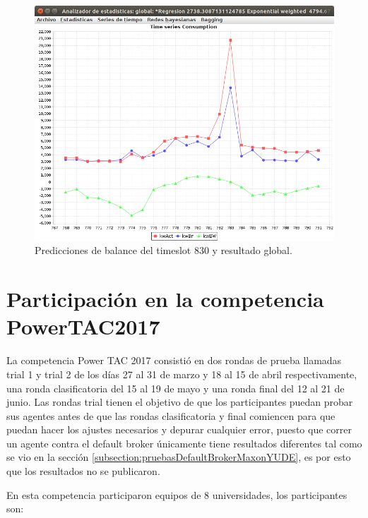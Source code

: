 \begin{figure}[h]
	\centering
	\includegraphics[width=12cm]{img/comparacionNuevoConAnterior3agentes.png}
	\caption{Predicciones de balance del timeslot 830 y resultado global. }
	\label{fig:comparacionNuevoConAnterior3agentes}
\end{figure}
\clearpage
\section{Participación en la competencia PowerTAC2017} \label{subsec:participacionComp}

La competencia Power TAC 2017 consistió en dos rondas de prueba llamadas trial 1 y trial 2 de los días 27 al 31 de marzo y 18 al 15 de abril respectivamente, una ronda clasificatoria del 15 al 19 de mayo y una ronda final del 12 al 21 de junio. 
Las rondas trial tienen el objetivo de que los participantes puedan probar sus agentes antes de que las rondas clasificatoria y final comiencen para que puedan hacer los ajustes necesarios y depurar cualquier error, puesto que correr un agente contra el default broker únicamente tiene resultados diferentes tal como se vio en la sección \ref{subsection:pruebasDefaultBrokerMaxonYUDE}, es por esto que los resultados no se publicaron.

En esta competencia participaron equipos de 8 universidades, los participantes son:


